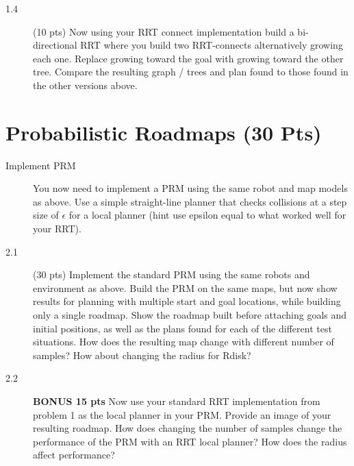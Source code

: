 \documentclass[11pt]{kuntz-hw}
\begin{document}
\begin{description}
\item[1.4] (10 pts) Now using your RRT connect implementation build a bi-directional RRT where you build two RRT-connects alternatively growing each one. Replace growing toward the goal with growing toward the other tree. Compare the resulting graph / trees and plan found to those found in the other versions above.
\end{description}

\section*{Probabilistic Roadmaps (30 Pts)}
\begin{description}
\item[Implement PRM] You now need to implement a PRM using the same robot and map models as above. Use a simple straight-line planner that checks collisions at a step size of \(\epsilon\) for a local planner (hint use epsilon equal to what worked well for your RRT).

\item[2.1] (30 pts) Implement the standard PRM using the same robots and environment as above. Build the PRM on the same maps, but now show results for planning with multiple start and goal locations, while building only a single roadmap. Show the roadmap built before attaching goals and initial positions, as well as the plans found for each of the different test situations. How does the resulting map change with different number of samples? How about changing the radius for Rdisk?

\item[2.2] \textbf{BONUS 15 pts} Now use your standard RRT implementation from problem 1 as the local planner in your PRM. Provide an image of your resulting roadmap. How does changing the number of samples change the performance of the PRM with an RRT local planner? How does the radius affect performance?
\end{description}
\end{document}
